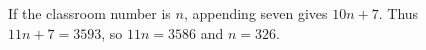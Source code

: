 If the classroom number is $n$, appending seven gives $10n+7$. Thus $11n+7=3593$, so $11n=3586$ and $\boxed{n=326}$.
